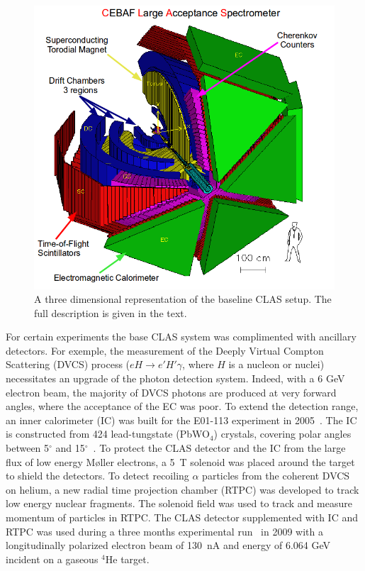 \documentclass[preprint,5p]{elsarticle}
\begin{document}
\begin{figure}[tbp]
\centering \includegraphics[scale=0.3]{fig/test_clas.png}
\caption{A three dimensional representation of the baseline CLAS setup. The
   full description is given in the text.} \label{fig:CLAS}
\end{figure}

For certain experiments the base CLAS system was complimented with ancillary 
detectors. For exemple, the measurement of the Deeply Virtual Compton 
Scattering (DVCS) process ($eH \rightarrow e' H' \gamma$, where $H$ is a 
nucleon or nuclei) necessitates an upgrade of the photon detection system. 
Indeed, with a 6 GeV electron beam, the majority of DVCS photons are produced 
at very forward angles, where the acceptance of the EC was poor. To extend the 
detection range, an inner calorimeter (IC) was built for the E01-113 
experiment in 2005~\cite{FX}. The IC is constructed from 424 lead-tungstate 
(PbWO$_{4}$) crystals, covering polar angles between 5$^{\circ}$ and 
15$^{\circ}$~\cite{Hyon-suk}. To protect the 
CLAS detector and the IC from the large flux of low energy M{\o}ller 
electrons, a 5~T solenoid was placed around the target to shield the detectors. 
To detect recoiling $\alpha$ particles from the coherent DVCS on helium, a new 
radial time projection chamber (RTPC) was developed to track low energy nuclear 
fragments. The solenoid field was used to track and measure momentum of 
particles in RTPC. The CLAS detector supplemented with IC and RTPC was used 
during a three months experimental run~\cite{proposal1,proposal2}
in 2009 with a longitudinally polarized electron beam of 130~nA 
and energy of 6.064 GeV incident on a gaseous $^{4}$He target.
\end{document}
